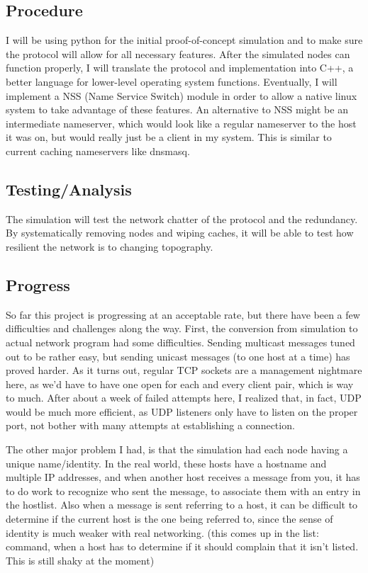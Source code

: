 \documentclass[12pt,letterpaper,titlepage]{article}
\begin{document}
\subsection{Procedure}
I will be using python for the initial proof-of-concept simulation and to make sure the protocol will allow for all necessary features. After the simulated nodes can function properly, I will translate the protocol and implementation into C++, a better language for lower-level operating system functions. Eventually, I will implement a NSS (Name Service Switch) module in order to allow a native linux system to take advantage of these features. An alternative to NSS might be an intermediate nameserver, which would look like a regular nameserver to the host it was on, but would really just be a client in my system. This is similar to current caching nameservers like dnsmasq.
\subsection{Testing/Analysis}
The simulation will test the network chatter of the protocol and the redundancy. By systematically removing nodes and wiping caches, it will be able to test how resilient the network is to changing topography.
\subsection{Progress}
So far this project is progressing at an acceptable rate, but there have been a few difficulties and challenges along the way. First, the conversion from simulation to actual network program had some difficulties. Sending multicast messages tuned out to be rather easy, but sending unicast messages (to one host at a time) has proved harder. As it turns out, regular TCP sockets are a management nightmare here, as we'd have to have one open for each and every client pair, which is way to much. After about a week of failed attempts here, I realized that, in fact, UDP would be much more efficient, as UDP listeners only have to listen on the proper port, not bother with many attempts at establishing a connection.

The other major problem I had, is that the simulation had each node having a unique name/identity. In the real world, these hosts have a hostname and multiple IP addresses, and when another host receives a message from you, it has to do work to recognize who sent the message, to associate them with an entry in the hostlist. Also when a message is sent referring to a host, it can be difficult to determine if the current host is the one being referred to, since the sense of identity is much weaker with real networking. (this comes up in the list: command, when a host has to determine if it should complain that it isn't listed. This is still shaky at the moment)
\end{document}
